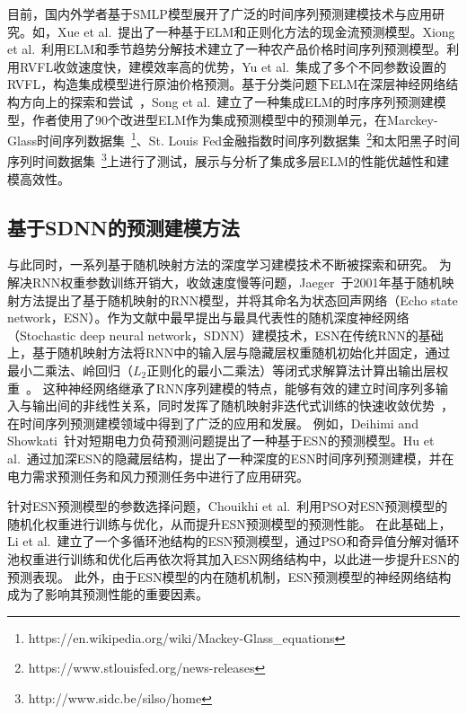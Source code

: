 目前，国内外学者基于SMLP模型展开了广泛的时间序列预测建模技术与应用研究。如，Xue et al.~\cite{xueFinancial2018}提出了一种基于ELM和正则化方法的现金流预测模型。Xiong et al.~\cite{xiongSeasonal2018}利用ELM和季节趋势分解技术建立了一种农产品价格时间序列预测模型。利用RVFL收敛速度快，建模效率高的优势，Yu et al.~\cite{yuInvestigation2020}集成了多个不同参数设置的RVFL，构造集成模型进行原油价格预测。基于分类问题下ELM在深层神经网络结构方向上的探索和尝试~\cite{yuLearning2015,tangExtreme2016}，Song et al.~\cite{songNovel2017}建立了一种集成ELM的时序序列预测建模型，作者使用了90个改进型ELM作为集成预测模型中的预测单元，在Marckey-Glass时间序列数据集~\footnote{https://en.wikipedia.org/wiki/Mackey-Glass\_equations}、St. Louis Fed金融指数时间序列数据集~\footnote{https://www.stlouisfed.org/news-releases}和太阳黑子时间序列时间数据集~\footnote{http://www.sidc.be/silso/home}上进行了测试，展示与分析了集成多层ELM的性能优越性和建模高效性。

\subsection{基于SDNN的预测建模方法}

与此同时，一系列基于随机映射方法的深度学习建模技术不断被探索和研究。
为解决RNN权重参数训练开销大，收敛速度慢等问题，Jaeger~\cite{jaegerEcho2001}于2001年基于随机映射方法提出了基于随机映射的RNN模型，并将其命名为状态回声网络（Echo state network，ESN）。作为文献中最早提出与最具代表性的随机深度神经网络（Stochastic deep neural network，SDNN）建模技术，ESN在传统RNN的基础上，基于随机映射方法将RNN中的输入层与隐藏层权重随机初始化并固定，通过最小二乘法、岭回归（$L_2$正则化的最小二乘法）等闭式求解算法计算出输出层权重~\cite{shen2018duoxishu}。
这种神经网络继承了RNN序列建模的特点，能够有效的建立时间序列多输入与输出间的非线性关系，同时发挥了随机映射非迭代式训练的快速收敛优势~\cite{jaegerAdaptive2002}，在时间序列预测建模领域中得到了广泛的应用和发展。
例如，Deihimi and Showkati~\cite{deihimiApplication2012}针对短期电力负荷预测问题提出了一种基于ESN的预测模型。Hu et al.~\cite{huForecasting2020}通过加深ESN的隐藏层结构，提出了一种深度的ESN时间序列预测建模，并在电力需求预测任务和风力预测任务中进行了应用研究。

针对ESN预测模型的参数选择问题，Chouikhi et al.~\cite{chouikhiPSObased2017}利用PSO对ESN预测模型的随机化权重进行训练与优化，从而提升ESN预测模型的预测性能。
在此基础上，Li et al.~\cite{liPSObased2019}建立了一个多循环池结构的ESN预测模型，通过PSO和奇异值分解对循环池权重进行训练和优化后再依次将其加入ESN网络结构中，以此进一步提升ESN的预测表现。
此外，由于ESN模型的内在随机机制，ESN预测模型的神经网络结构成为了影响其预测性能的重要因素。


